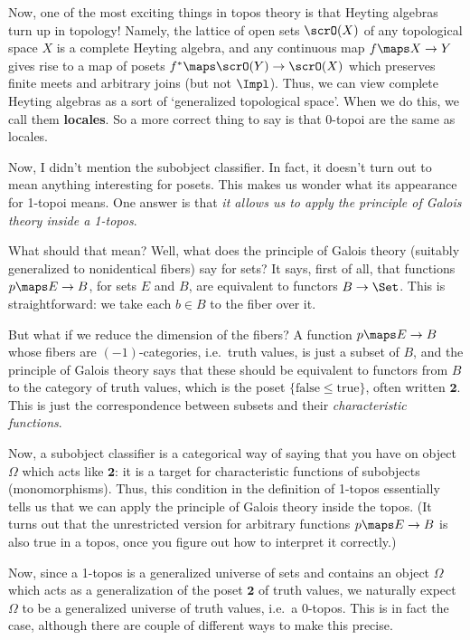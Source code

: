\documentclass{amsart}
\begin{document}
Now, one of the most exciting things in topos theory is that Heyting
algebras turn up in topology!  Namely, the lattice of open sets
$\scrO(X)$ of any topological space $X$ is a complete Heyting algebra,
and any continuous map $f\maps X\to Y$ gives rise to a map of posets
$f^*\maps \scrO(Y)\to \scrO(X)$ which preserves finite meets and
arbitrary joins (but not $\Impl$).  Thus, we can view complete Heyting
algebras as a sort of `generalized topological space'.  When we do
this, we call them \textbf{locales}.  So a more correct thing to say is
that 0-topoi are the same as locales.

Now, I didn't mention the subobject classifier.  In fact, it doesn't
turn out to mean anything interesting for posets.  This makes us
wonder what its appearance for 1-topoi means.  One answer is that
\emph{it allows us to apply the principle of Galois theory inside a
  1-topos}.

What should that mean?  Well, what does the principle of Galois theory
(suitably generalized to nonidentical fibers) say for sets?  It says,
first of all, that functions $p\maps E\to B$, for sets $E$ and $B$,
are equivalent to functors $B\to\Set$.  This is straightforward: we
take each $b\in B$ to the fiber over it.

But what if we reduce the dimension of the fibers?  A function $p\maps
E\to B$ whose fibers are $(-1)$-categories, i.e.\ truth values, is
just a subset of $B$, and the principle of Galois theory says that
these should be equivalent to functors from $B$ to the category of
truth values, which is the poset $\{\text{false} \le \text{true}\}$,
often written $\mathbf{2}$.  This is just the correspondence between
subsets and their \emph{characteristic functions}.

Now, a subobject classifier is a categorical way of saying that you
have on object $\Omega$ which acts like $\mathbf{2}$: it is a target
for characteristic functions of subobjects (monomorphisms).  Thus,
this condition in the definition of 1-topos essentially tells us that
we can apply the principle of Galois theory inside the topos.  (It
turns out that the unrestricted version for arbitrary functions
$p\maps E\to B$ is also true in a topos, once you figure out how to
interpret it correctly.)

Now, since a 1-topos is a generalized universe of sets and contains an
object $\Omega$ which acts as a generalization of the poset
$\mathbf{2}$ of truth values, we naturally expect $\Omega$ to be a
generalized universe of truth values, i.e.\ a 0-topos.  This is in
fact the case, although there are couple of different ways to make
this precise.
\end{document}
